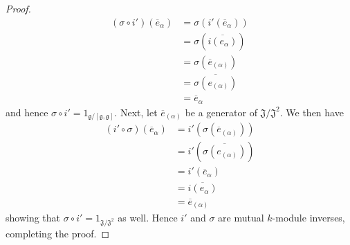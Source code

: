 \begin{proof}
  \begin{align*}
    (\sigma \circ i')(\overline{e}_\alpha) &= \sigma(i'(\overline{e}_\alpha)) \\
                                           &= \sigma(\overline{i(e_\alpha)}) \\
                                           &= \sigma(\overline{e}_{(\alpha)}) \\
                                           &= \overline{\sigma(e_{(\alpha)})} \\
                                           &= \overline{e}_\alpha
  \end{align*}
  and hence $ \sigma \circ i' = 1_{\mathfrak{g}/[\mathfrak{g}, \mathfrak{g}]} $. Next, let $ \overline{e}_{(\alpha)} $ be a generator of $ \mathfrak{J}/\mathfrak{J}^2 $. We then have
  \begin{align*}
    (i' \circ \sigma)(\overline{e}_{\alpha}) &= i'(\sigma(\overline{e}_{(\alpha)})) \\
                                             &= i'(\overline{\sigma(e_{(\alpha)})}) \\
                                             &= i'(\overline{e}_{\alpha}) \\
                                             &= \overline{i(e_{\alpha})} \\
                                             &= \overline{e}_{(\alpha)}
  \end{align*}
  showing that $ \sigma \circ i' = 1_{\mathfrak{J}/\mathfrak{J}^2} $ as well. Hence $ i' $ and $ \sigma $ are mutual $ k $-module inverses, completing the proof.
\end{proof}


